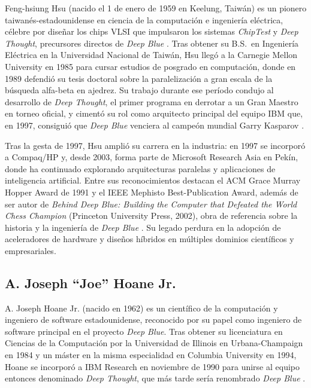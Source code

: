 \documentclass[a4paper, 12pt]{article}
\begin{document}
Feng-hsiung Hsu (nacido el 1 de enero de 1959 en Keelung, 
Taiwán) es un pionero taiwanés-estadounidense en ciencia de la 
computación e ingeniería eléctrica, célebre por diseñar los chips 
VLSI que impulsaron los sistemas \emph{ChipTest} y \emph{Deep Thought}, 
precursores directos de \textit{Deep Blue} 
\cite{chessprog_hsu}. Tras obtener su B.S.\ en 
Ingeniería Eléctrica en la Universidad Nacional de Taiwán, Hsu 
llegó a la Carnegie Mellon University en 1985 para cursar estudios 
de posgrado en computación, donde en 1989 defendió su tesis 
doctoral sobre la paralelización a gran escala de la búsqueda alfa-beta 
en ajedrez. Su trabajo durante ese período 
condujo al desarrollo de \emph{Deep Thought}, el primer programa en 
derrotar a un Gran Maestro en torneo oficial, y cimentó su rol 
como arquitecto principal del equipo IBM que, en 1997, consiguió 
que \textit{Deep Blue} venciera al campeón mundial Garry Kasparov 
\cite{ibmHistoryDeepBlue}.

Tras la gesta de 1997, Hsu amplió su carrera en la industria: en 
1997 se incorporó a Compaq/HP y, desde 2003, forma parte de 
Microsoft Research Asia en Pekín, donde ha continuado explorando 
arquitecturas paralelas y aplicaciones de inteligencia artificial. 
Entre sus reconocimientos destacan el ACM 
Grace Murray Hopper Award de 1991 y el IEEE Mephisto 
Best-Publication Award, además de ser autor de \emph{Behind Deep 
Blue: Building the Computer that Defeated the World Chess Champion} 
(Princeton University Press, 2002), obra de referencia sobre la 
historia y la ingeniería de \textit{Deep Blue} \cite{hsu2022behind}. 
Su legado perdura en la adopción de aceleradores de hardware y 
diseños híbridos en múltiples dominios científicos y empresariales.

\subsection*{A. Joseph “Joe” Hoane Jr.}

A. Joseph Hoane Jr. (nacido en 1962) es un científico de la 
computación y ingeniero de software estadounidense, reconocido por 
su papel como ingeniero de software principal en el proyecto 
\emph{Deep Blue}. Tras obtener su licenciatura en Ciencias de la 
Computación por la Universidad de Illinois en Urbana-Champaign en 
1984 y un máster en la misma especialidad en Columbia University 
en 1994, Hoane se incorporó a IBM Research en noviembre de 1990 
para unirse al equipo entonces denominado \emph{Deep Thought}, 
que más 
tarde sería renombrado \emph{Deep Blue} \cite{chessprog_hoane}.  
\end{document}
